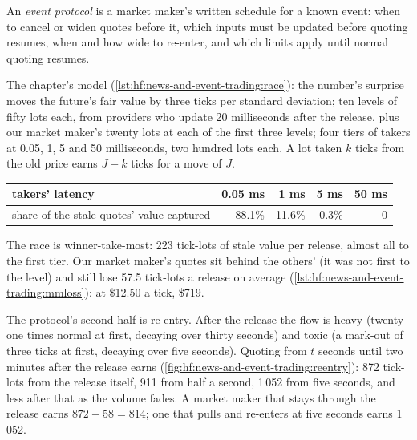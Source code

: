 \begin{definition}\label{def:hf:news-and-event-trading:protocol}
An \emph{event protocol} is a market maker's written schedule for a known event: when to cancel or widen quotes before it,
which inputs must be updated before quoting resumes, when and how wide to re-enter, and which limits apply until normal quoting resumes.
\end{definition}

The chapter's model (\cref{lst:hf:news-and-event-trading:race}): the number's surprise moves the future's fair value by three ticks per standard
deviation; ten levels of fifty lots each, from providers who update 20 milliseconds after the release, plus our market maker's twenty lots at each of
the first three levels; four tiers of takers at 0.05, 1, 5 and 50 milliseconds, two hundred lots each. A lot taken $k$ ticks from the old price
earns $J-k$ ticks for a move of $J$.

\begin{center}
\small
\begin{tabular}{@{}lrrrr@{}}
\toprule
takers' latency & 0.05 ms & 1 ms & 5 ms & 50 ms\\
\midrule
share of the stale quotes' value captured & 88.1\% & 11.6\% & 0.3\% & 0\\
\bottomrule
\end{tabular}
\end{center}

The race is winner-take-most: 223 tick-lots of stale value per release, almost all to the first tier. Our market maker's quotes sit behind the
others' (it was not first to the level) and still lose 57.5 tick-lots a release on average (\cref{lst:hf:news-and-event-trading:mmloss}): at \$12.50 a
tick, \$719.

The protocol's second half is re-entry. After the release the flow is heavy (twenty-one times normal at first, decaying over thirty seconds) and
toxic (a mark-out of three ticks at first, decaying over five seconds). Quoting from $t$ seconds until two minutes after the release earns
(\cref{fig:hf:news-and-event-trading:reentry}): 872 tick-lots from the release itself, 911 from half a second, 1\,052 from five seconds, and less
after that as the volume fades. A market maker that stays through the release earns $872-58=814$; one that pulls and re-enters at five seconds earns
1\,052.

